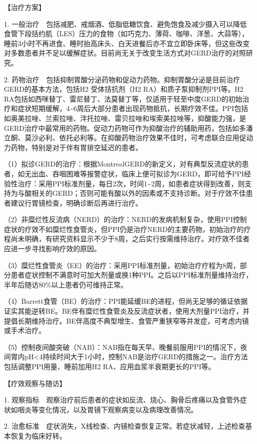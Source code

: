 【治疗方案】

1.
一般治疗　包括减肥、戒烟酒、低脂低糖饮食、避免饱食及减少摄入可以降低食管下段括约肌（LES）压力的食物（如巧克力、薄荷、咖啡、洋葱、大蒜等），睡前3小时不再进食、睡时抬高床头、白天进餐后亦不宜立即卧床等，但这些改变对多数患者并不足以缓解症状。目前尚无关于改变生活方式对GERD治疗的对照研究。

2.
药物治疗　包括抑制胃酸分泌药物和促动力药物。抑制胃酸分泌是目前治疗GERD的基本方法，包括H{2}
受体拮抗剂（H{2} RA）和质子泵抑制剂PPI等。H{2}
RA包括如西咪替丁、雷尼替丁、法莫替丁等，仅适用于轻至中度GERD的初始治疗和症状短期缓解，4\textasciitilde{}6周后大部分患者出现药物抵抗，长期疗效不佳。PPI包括如奥美拉唑、兰索拉唑、泮托拉唑、雷贝拉唑和埃索美拉唑等，抑酸能力强，是GERD治疗中最常用的药物。促动力药物可作为抑酸治疗的辅助用药，包括如多潘立酮、莫沙必利、依托必利等。在抑酸药物治疗效果不佳时，可考虑联合应用促动力药物，特别是对于伴有胃排空延迟的患者。

（1）拟诊GERD的治疗：根据MontrealGERD的新定义，对有典型反流症状的患者，如无出血、吞咽困难等报警症状，临床上便可拟诊为GERD，即可给予PPI经验性治疗：采用PPI标准剂量，每日2次，时间1\textasciitilde{}2周，如患者症状得到改善，则支持为与酸相关的GERD；否则可能有酸以外的因素或不支持诊断。对于疗效不佳患者建议行胃镜检查，明确诊断后再进行治疗。

（2）非糜烂性反流病（NERD）的治疗：NERD的发病机制复杂，使用PPI控制症状的疗效不如糜烂性食管炎，但PPI仍是治疗NERD的主要药物，初始治疗的疗程尚未明确，有研究资料显示不少于8周，之后实行按需维持治疗。对疗效不佳者应进一步寻找影响疗效的原因。

（3）糜烂性食管炎（EE）的治疗：采用PPI标准剂量，初始治疗疗程为8周，部分患者症状控制不满意时可加大剂量或换1种PPI。之后以PPI标准剂量维持治疗，半年后随访80\%以上患者仍可维持正常。

（4）Barrett食管（BE）的治疗：PPI能延缓BE的进程，但尚无足够的循证依据证实其能逆转BE。BE伴有糜烂性食管炎及反流症状者，使用大剂量PPI治疗，并提倡长期维持治疗。BE伴高度不典型增生、食管严重狭窄等并发症，可考虑内镜或手术治疗。

（5）控制夜间酸突破（NAB）：NAB指在每天早、晚餐前服用PPI的情况下，夜间胃内pH\textless{}4持续时间大于1小时，控制NAB是治疗GERD的措施之一。治疗方法包括调整PPI用量、睡前加用H{2}
RA、应用血浆半衰期更长的PPI等。

【疗效观察与随访】

1.
观察指标　观察治疗前后患者的症状如反流、烧心、胸骨后疼痛以及食管外症状如咽炎等变化情况，以及胃镜下观察病变以及病理改善情况。

2.
治愈标准　症状消失，X线检查、内镜检查恢复正常。若症状减轻，上述检查基本恢复为临床好转。

